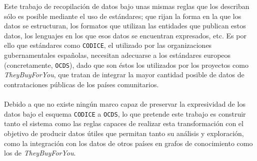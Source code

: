     Este trabajo de recopilación de datos bajo unas mismas reglas que los describan sólo es posible mediante el uso de estándares; que rijan la forma en la que los datos se estructuran, los formatos que utilizan las entidades que publican estos datos, los lenguajes en los que esos datos se encuentran expresados, etc. Es por ello que estándares como \texttt{CODICE}, el utilizado por las organizaciones gubernamentales españolas, necesitan adecuarse a los estándares europeos (concretamente, \texttt{OCDS}), dado que son éstos los utilizados por los proyectos como \textit{TheyBuyForYou}, que tratan de integrar la mayor cantidad posible de datos de contrataciones públicas de los países comunitarios.
    \\ \\
    Debido a que no existe ningún marco capaz de preservar la expresividad de los datos bajo el esquema \texttt{CODICE} a \texttt{OCDS}, lo que pretende este trabajo es construir tanto el sistema como las reglas capaces de realizar esta transformación con el objetivo de producir datos útiles que permitan tanto su análisis y exploración, como la integración con los datos de otros países en grafos de conocimiento como los de \textit{TheyBuyForYou}.
\newpage